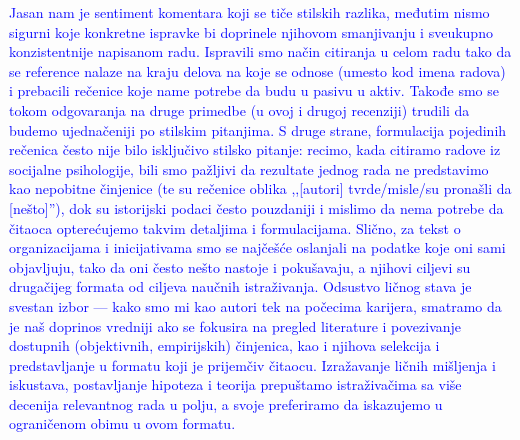 \documentclass[a4paper]{report}
\newcommand{\odgovor}[1]{\textcolor{blue}{#1}}
\begin{document}
\odgovor{Jasan nam je sentiment komentara koji se tiče stilskih razlika, međutim nismo sigurni koje konkretne ispravke bi doprinele njihovom smanjivanju i sveukupno konzistentnije napisanom radu. Ispravili smo način citiranja u celom radu tako da se reference nalaze na kraju delova na koje se odnose (umesto kod imena radova) i prebacili rečenice koje name potrebe da budu u pasivu u aktiv. Takođe smo se tokom odgovaranja na druge primedbe (u ovoj i drugoj recenziji) trudili da budemo ujednačeniji po stilskim pitanjima. S druge strane, formulacija pojedinih rečenica često nije bilo isključivo stilsko pitanje: recimo, kada citiramo radove iz socijalne psihologije, bili smo pažljivi da rezultate jednog rada ne predstavimo kao nepobitne činjenice (te su rečenice oblika ,,[autori] tvrde/misle/su pronašli da [nešto]''), dok su istorijski podaci često pouzdaniji i mislimo da nema potrebe da čitaoca opterećujemo takvim detaljima i formulacijama. Slično, za tekst o organizacijama i inicijativama smo se najčešće oslanjali na podatke koje oni sami objavljuju, tako da oni često nešto nastoje i pokušavaju, a njihovi ciljevi su drugačijeg formata od ciljeva naučnih istraživanja.
Odsustvo ličnog stava je svestan izbor --- kako smo mi kao autori tek na počecima karijera, smatramo da je naš doprinos vredniji ako se fokusira na pregled literature i povezivanje dostupnih (objektivnih, empirijskih) činjenica, kao i njihova selekcija i predstavljanje u formatu koji je prijemčiv čitaocu. Izražavanje ličnih mišljenja i iskustava, postavljanje hipoteza i teorija prepuštamo istraživačima sa više decenija relevantnog rada u polju, a svoje preferiramo da iskazujemo u ograničenom obimu u ovom formatu.}
\end{document}
